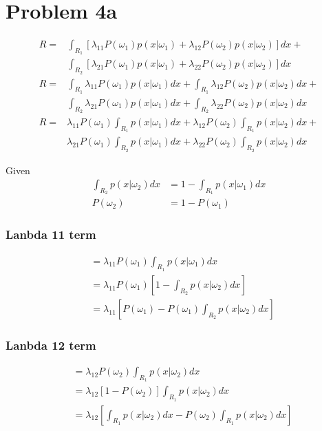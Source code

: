 \documentclass{IEEEtran}
\begin{document}
\newpage

\section{Problem 4a}
\begin{align*}
    R = & \int_{R_1}\left[\lambda_{11}P(\omega_1)p(x|\omega_1) + \lambda_{12}P(\omega_2)p(x|\omega_2)\right]dx + \\
        & \int_{R_2}\left[\lambda_{21}P(\omega_1)p(x|\omega_1) + \lambda_{22}P(\omega_2)p(x|\omega_2)\right]dx \\
    R = & \int_{R_1}\lambda_{11}P(\omega_1)p(x|\omega_1)dx + \int_{R_1}\lambda_{12}P(\omega_2)p(x|\omega_2)dx + \\
        & \int_{R_2}\lambda_{21}P(\omega_1)p(x|\omega_1)dx + \int_{R_2}\lambda_{22}P(\omega_2)p(x|\omega_2)dx \\
    R = & \lambda_{11}P(\omega_1)\int_{R_1}p(x|\omega_1)dx + \lambda_{12}P(\omega_2)\int_{R_1}p(x|\omega_2)dx + \\
        & \lambda_{21}P(\omega_1)\int_{R_2}p(x|\omega_1)dx + \lambda_{22}P(\omega_2)\int_{R_2}p(x|\omega_2)dx
\end{align*}

Given
\begin{align}
    \int_{R_2}p(x|\omega_2)dx &= 1 - \int_{R_1}p(x|\omega_1)dx \\
    P(\omega_2) &= 1 - P(\omega_1)
\end{align}

\subsubsection{Lanbda 11 term}
\begin{align*}
    &= \lambda_{11}P(\omega_1)\int_{R_1}p(x|\omega_1)dx \\
    &= \lambda_{11}P(\omega_1)\left[1 - \int_{R_2}p(x|\omega_2)dx \right] \\
    &= \lambda_{11}\left[P(\omega_1) - P(\omega_1)\int_{R_2}p(x|\omega_2)dx \right]
\end{align*}

\subsubsection{Lanbda 12 term}
\begin{align*}
    &= \lambda_{12}P(\omega_2)\int_{R_1}p(x|\omega_2)dx \\
    &= \lambda_{12}\left[1 - P(\omega_2)\right]\int_{R_1}p(x|\omega_2)dx \\
    &= \lambda_{12}\left[\int_{R_1}p(x|\omega_2)dx - P(\omega_2)\int_{R_1}p(x|\omega_2)dx \right]
\end{align*}
\end{document}
